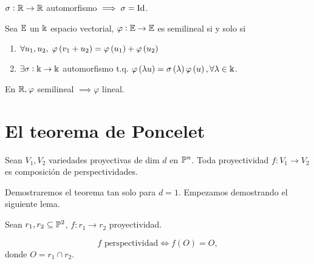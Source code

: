 \begin{ej}
    $\sigma : \mathbb{R} \to \mathbb{R}$ automorfismo $\implies \sigma = \operatorname{Id}$.
\end{ej}
\begin{defi}
    Sea $\mathbb{E}$ un $\Bbbk$ espacio vectorial, $\varphi : \mathbb{E} \to \mathbb{E}$ es semilineal si y solo si
    \begin{enumerate}[(1)]
        \item $\forall u_1, u_2, \; \varphi \left( v_1 + u_2 \right) = \varphi \left( u_1 \right) + \varphi \left( u_2 \right)$
        \item $\exists \sigma: \Bbbk \to \Bbbk$ automorfismo t.q. $\varphi \left( \lambda u \right) = \sigma \left( \lambda \right) \varphi \left( u \right), \forall \lambda \in \Bbbk$.
    \end{enumerate}
\end{defi}
\begin{obs}
    En $\mathbb{R}, \varphi$ semilineal $\implies \varphi$ lineal.
\end{obs}

\section{El teorema de Poncelet}

\begin{teo}[de Poncelet]
    Sean $V_1, V_2$ variedades proyectivas de dim $d$ en $\mathbb{P}^n$. Toda proyectividad $f \colon V_1 \to V_2$
    es composición de perspectividades.
\end{teo}

Demostraremos el teorema tan solo para $d = 1$. Empezamos
demostrando el siguiente lema.

\begin{lema} 
    \label{lema_poncelet}
    Sean $r_1, r_2 \subseteq \mathbb{P}^2$, $f \colon r_1 \to r_2$ proyectividad.
    
    \[f \text{ perspectividad} \iff f(O) = O,\]
    donde $O = r_1 \cap r_2$.
\end{lema}

